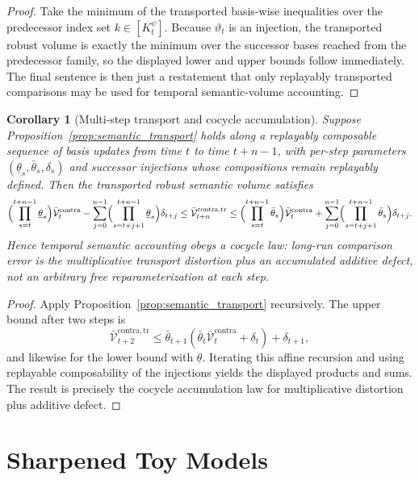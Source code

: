 \documentclass[11pt]{article}
\newtheorem{corollary}[theorem]{Corollary}
\theoremstyle{definition}
\newcommand{\1}{\mathbf{1}}
\begin{document}
\begin{proof}
Take the minimum of the transported basis-wise inequalities over the predecessor index set $k\in[K_t^{\psi}]$. Because $\vartheta_t$ is an injection, the transported robust volume is exactly the minimum over the successor bases reached from the predecessor family, so the displayed lower and upper bounds follow immediately. The final sentence is then just a restatement that only replayably transported comparisons may be used for temporal semantic-volume accounting.
\end{proof}
\begin{corollary}[Multi-step transport and cocycle accumulation]\label{cor:semantic_transport_cocycle}
Suppose Proposition~\ref{prop:semantic_transport} holds along a replayably composable sequence of basis updates from time $t$ to time $t+n-1$, with per-step parameters $(\underline\theta_s,\bar\theta_s,\delta_s)$ and successor injections whose compositions remain replayably defined. Then the transported robust semantic volume satisfies
\[
\Bigl(\prod_{s=t}^{t+n-1}\underline\theta_s\Bigr)\bar{\mathcal V}_t^{\mathrm{contra}} - \sum_{j=0}^{n-1}\Bigl(\prod_{s=t+j+1}^{t+n-1}\underline\theta_s\Bigr)\delta_{t+j}
\le
\bar{\mathcal V}_{t+n}^{\mathrm{contra},\mathrm{tr}}
\le
\Bigl(\prod_{s=t}^{t+n-1}\bar\theta_s\Bigr)\bar{\mathcal V}_t^{\mathrm{contra}} + \sum_{j=0}^{n-1}\Bigl(\prod_{s=t+j+1}^{t+n-1}\bar\theta_s\Bigr)\delta_{t+j}.
\]
Hence temporal semantic accounting obeys a cocycle law: long-run comparison error is the multiplicative transport distortion plus an accumulated additive defect, not an arbitrary free reparameterization at each step.
\end{corollary}

\begin{proof}
Apply Proposition~\ref{prop:semantic_transport} recursively. The upper bound after two steps is
\[
\bar{\mathcal V}_{t+2}^{\mathrm{contra},\mathrm{tr}}
\le
\bar\theta_{t+1}(\bar\theta_t\bar{\mathcal V}_t^{\mathrm{contra}}+\delta_t)+\delta_{t+1},
\]
and likewise for the lower bound with $\underline\theta$. Iterating this affine recursion and using replayable composability of the injections yields the displayed products and sums. The result is precisely the cocycle accumulation law for multiplicative distortion plus additive defect.
\end{proof}

\section{Sharpened Toy Models}
\end{document}
